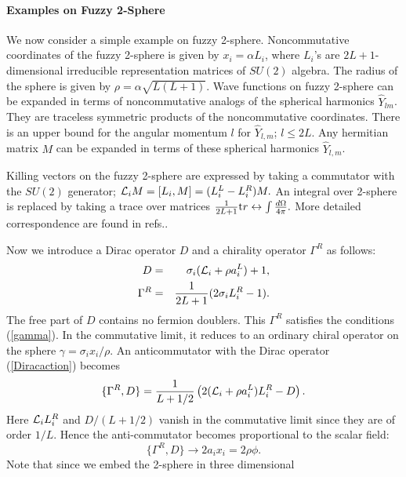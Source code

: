 \documentclass[a4paper,prl,showpacs,twocolumn]{revtex4}
\begin{document}
\paragraph{ {\bf Examples on Fuzzy 2-Sphere}}
We now consider a simple example on fuzzy 2-sphere.
Noncommutative coordinates of the 
fuzzy 2-sphere is given by
$ x_i =\alpha L_i$,
where $L_i$'s are  $2L+1$-dimensional irreducible 
representation matrices of $SU(2)$ algebra.
The radius of the sphere is given by $\rho=\alpha \sqrt{L(L+1)}$.
Wave functions on fuzzy 2-sphere can be expanded in terms of noncommutative
analogs of the spherical harmonics $\hat{Y}_{lm}$.
They are traceless symmetric products of
the noncommutative coordinates.
There is an upper bound for the angular momentum
$l$ for $\hat{Y}_{l,m}$; $l \le 2L$.
Any hermitian matrix $M$ can be expanded in terms of 
these spherical harmonics $\hat{Y}_{l,m}$.
\par
Killing vectors on the fuzzy 2-sphere are expressed 
by taking a commutator with the $SU(2)$ generator; 
$ {\cal L}_i M= [L_i, M] =(L_i^L-L_i^R)M. $
An integral over 2-sphere is replaced by taking a trace over matrices
$ \frac{1}{2L+1} {\text tr} \leftrightarrow \int 
\frac{d \Omega}{4 \pi}. $
More detailed correspondence are found in refs.\cite{IKTW,AIN}.
\par
Now we introduce a Dirac operator $D$ and a chirality operator
$\Gamma^R$ as follows: 
\begin{eqnarray}
D&=&\sigma_i({\cal L}_i+\rho a_i^L)+1,  \label{Diracaction} \\
\Gamma^R &=& \frac{1}{2L+1}(2\sigma_i L_i^R -1).
\label{GammaR}
\end{eqnarray}
The free part of $D$ contains no fermion 
doublers\cite{balagovi}.
This $\Gamma^R$ satisfies the conditions (\ref{gamma}).
In the commutative limit, it
 reduces to an ordinary chiral operator on the sphere
$\gamma=\sigma_i x_i/ \rho$.
An anticommutator with the Dirac operator (\ref{Diracaction}) 
becomes
\begin{equation}
\{\Gamma^R,D \}= \frac{1}{L+1/2} \left(
2({\cal L}_i+\rho a_i^L)L_i^R - D
\right). \label{gammaDac}
\end{equation}
Here ${\cal L}_i L_i^R$ and $D/(L+1/2)$ vanish in the 
commutative 
limit since they are of order $1/L$.
Hence the anti-commutator becomes proportional to the 
scalar field:
\begin{equation}
\{\Gamma^R,D \} \rightarrow 2  a_i x_i = 2 \rho \phi.
\end{equation}
Note that since we embed the 2-sphere in three dimensional
\end{document}
